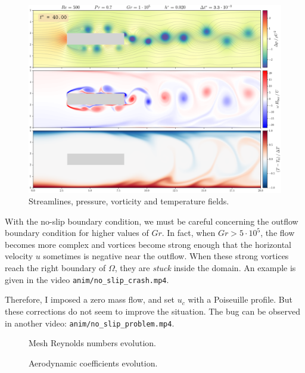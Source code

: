 \documentclass[11 pt]{article}
\begin{document}
\begin{figure}[H]
    \centering
    \includegraphics[width=\textwidth]{../figures/frame_00400_no_slip.png}
    \caption{Streamlines, pressure, vorticity and temperature fields.}
    \label{fig:simu_no_slip}
\end{figure}

With the no-slip boundary condition, we must be careful concerning the outflow boundary condition for higher values of $Gr$. In fact, when $Gr > 5 \cdot 10^{5}$, the flow becomes more complex and vortices become strong enough that the horizontal velocity $u$ sometimes is negative near the outflow. When these strong vortices reach the right boundary of $\Omega$, they are \textit{stuck} inside the domain. An example is given in the video \texttt{anim/no\_slip\_crash.mp4}.

Therefore, I imposed a zero mass flow, and set $u_c$ with a Poiseuille profile. But these corrections do not seem to improve the situation. The bug can be observed in another video: \texttt{anim/no\_slip\_problem.mp4}.

\begin{figure}[H]
    \centering
    
    \caption{Mesh Reynolds numbers evolution.}
    \label{fig:mesh_re_no_slip}
\end{figure}

\begin{figure}[H]
    \centering
    
    \caption{Aerodynamic coefficients evolution.}
    \label{fig:drag_no_slip}
\end{figure}
\end{document}
